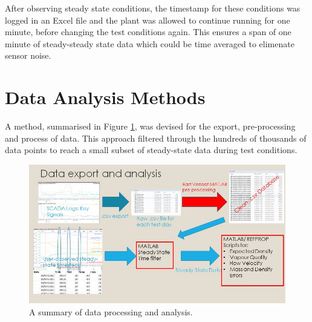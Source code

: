 \documentclass{report}
\begin{document}
After observing steady state conditions, the timestamp for these conditions was logged in an Excel file and the plant was allowed to continue running for one minute, before changing the test conditions again. This ensures a span of one minute of steady-steady state data which could be time averaged to elimenate sensor noise.
\FloatBarrier
\section{Data Analysis Methods} \label{analysis}
A method, summarised in Figure \ref{fig:processing}, was devised for the export, pre-processing and process of data. This approach filtered through the hundreds of thousands of data points to reach a small subset of steady-state data during test conditions. 
\begin{figure}
\includegraphics[width=\textwidth]{processing}
\caption{A summary of data processing and analysis.}
\label{fig:processing}
\end{figure}
\FloatBarrier
\end{document}
